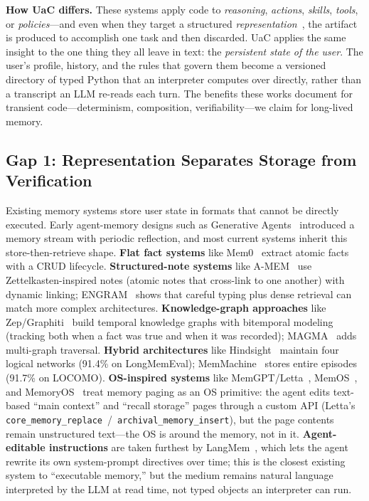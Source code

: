 \textbf{How UaC differs.} These systems apply code to \emph{reasoning}, \emph{actions}, \emph{skills}, \emph{tools}, or \emph{policies}---and even when they target a structured \emph{representation}~\citep{madaan2022cocogen}, the artifact is produced to accomplish one task and then discarded. UaC applies the same insight to the one thing they all leave in text: the \emph{persistent state of the user}. The user's profile, history, and the rules that govern them become a versioned directory of typed Python that an interpreter computes over directly, rather than a transcript an LLM re-reads each turn. The benefits these works document for transient code---determinism, composition, verifiability---we claim for long-lived memory.

\subsection{Gap 1: Representation Separates Storage from Verification}

Existing memory systems store user state in formats that cannot be directly executed. Early agent-memory designs such as Generative Agents~\citep{park2023generative} introduced a memory stream with periodic reflection, and most current systems inherit this store-then-retrieve shape. \textbf{Flat fact systems} like Mem0~\citep{chhikara2025mem0} extract atomic facts with a CRUD lifecycle. \textbf{Structured-note systems} like A-MEM~\citep{xu2025amem} use Zettelkasten-inspired notes (atomic notes that cross-link to one another) with dynamic linking; ENGRAM~\citep{patel2025engram} shows that careful typing plus dense retrieval can match more complex architectures. \textbf{Knowledge-graph approaches} like Zep/Graphiti~\citep{rasmussen2025zep} build temporal knowledge graphs with bitemporal modeling (tracking both when a fact was true and when it was recorded); MAGMA~\citep{jiang2026magma} adds multi-graph traversal. \textbf{Hybrid architectures} like Hindsight~\citep{latimer2025hindsight} maintain four logical networks (91.4\% on LongMemEval); MemMachine~\citep{wang2026memmachine} stores entire episodes (91.7\% on LOCOMO). \textbf{OS-inspired systems} like MemGPT/Letta~\citep{packer2023memgpt}, MemOS~\citep{li2025memos}, and MemoryOS~\citep{kang2025memoryos} treat memory paging as an OS primitive: the agent edits text-based ``main context'' and ``recall storage'' pages through a custom API (Letta's \texttt{core\_memory\_replace}~/~\texttt{archival\_memory\_insert}), but the page contents remain unstructured text---the OS is around the memory, not in it. \textbf{Agent-editable instructions} are taken furthest by LangMem~\citep{langmem2025}, which lets the agent rewrite its own system-prompt directives over time; this is the closest existing system to ``executable memory,'' but the medium remains natural language interpreted by the LLM at read time, not typed objects an interpreter can run.

